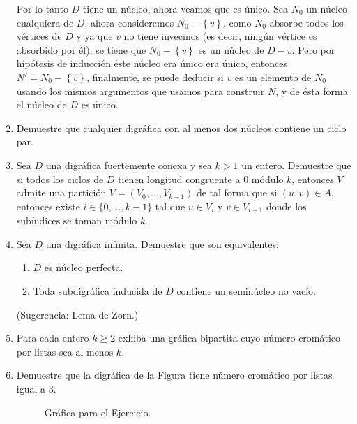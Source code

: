 \documentclass{article}
\newcommand{\set}[1]{\left\{ #1 \right\}}
\begin{document}
\begin{enumerate}
    Por lo tanto $D$ tiene un núcleo, ahora veamos que es único. Sea $N_0$ un núcleo cualquiera de $D$, ahora consideremos $N_0-\set{v}$, como $N_0$ absorbe todos los vértices de $D$ y ya que $v$ no tiene invecinos (es decir, ningún vértice es absorbido por él), se tiene que $N_0-\set{v}$ es un núcleo de $D-v$. Pero por hipótesis de inducción éste núcleo era único era único, entonces $N'=N_0-\set{v}$, finalmente, se puede deducir si $v$ es un elemento de $N_0$ usando los mismos argumentos que usamos para construir $N$, y de ésta forma el núcleo de $D$ es único.
  \item Demuestre que cualquier digr\'afica con al menos dos n\'ucleos
    contiene un ciclo par.

  \item Sea $D$ una digr\'afica fuertemente conexa y sea $k > 1$ un entero.
    Demuestre que si todos los ciclos de $D$ tienen longitud congruente a
    $0$ m\'odulo $k$, entonces $V$ admite una partici\'on $V = (V_0, \dots,
    V_{k-1})$ de tal forma que si $(u,v) \in A$, entonces existe $i \in
    \{ 0, \dots, k-1 \}$ tal que $u \in V_i$ y $v \in V_{i+1}$ donde los
    sub\'indices se toman m\'odulo $k$.

  \item Sea $D$ una digr\'afica infinita.  Demuestre que son equivalentes:
    \begin{enumerate}
      \item $D$ es n\'ucleo perfecta.

      \item Toda subdigr\'afica inducida de $D$ contiene un semin\'ucleo no
        vac\'io.
    \end{enumerate}
    (Sugerencia: Lema de Zorn.)

  \item Para cada entero $k \ge 2$ exhiba una gr\'afica bipartita cuyo
    n\'umero crom\'atico por listas sea al menos $k$.

  \item Demuestre que la digr\'afica de la Figura tiene
    n\'umero crom\'atico por listas igual a $3$.
    \begin{figure}[ht!]
    \centering
    \caption{Gr\'afica para el Ejercicio.}
    \end{figure}
\end{enumerate}
\end{document}

